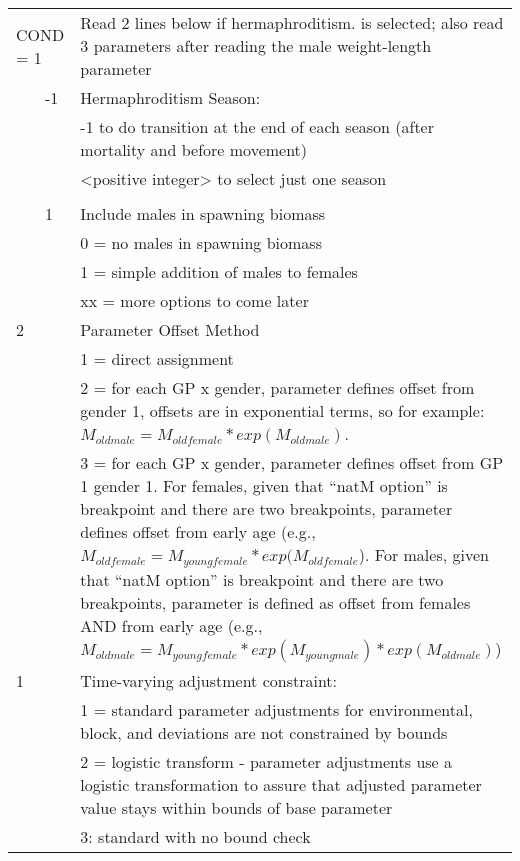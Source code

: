 \begin{center}
\begin{longtable}{p{0.5cm} p{2cm} p{12cm}}
	  \multicolumn{2}{l}{COND = 1}& Read 2 lines below if hermaphroditism. is selected; also read 3 parameters after reading the male weight-length parameter\\
	  & -1 & Hermaphroditism Season: \\
	  &    & -1 to do transition at the end of each season (after mortality and before movement)\\
	  &    & <positive integer> to select just one season\\
	  \\
	  & 1  & Include males in spawning biomass \\
	  &    & 0 = no males in spawning biomass \\
	  &    & 1 = simple addition of males to females\\
	  &    & xx = more options to come later \\
	  \hline

	  2 & & Parameter Offset Method \\
	    & & 1 = direct assignment \\
	    & & 2 = for each GP x gender, parameter defines offset from gender 1, offsets are in exponential terms, so for example: $M_{oldmale} = M_{oldfemale}*exp(M_{oldmale})$. \\
	    & & 3 = for each GP x gender, parameter defines offset from GP 1 gender 1.  For females, given that “natM option” is breakpoint and there are two breakpoints, parameter defines offset from early age (e.g., $M_{oldfemale} = M_{youngfemale}*exp(M_{oldfemale}$). For males, given that “natM option” is breakpoint and there are two breakpoints, parameter is defined as offset from females AND from early age (e.g., $M_{oldmale} = M_{youngfemale}*exp(M_{youngmale})*exp(M_{oldmale})$)\\
	 \hline

	 1 & & Time-varying adjustment constraint:\\
	   & & 1 = standard parameter adjustments for environmental, block, and deviations are not constrained by bounds \\
	   & & 2 = logistic transform - parameter adjustments use a logistic transformation to assure that adjusted parameter value stays within bounds of base parameter \\
	   & & 3: standard with no bound check \\
	 \hline

	\end{longtable}
\end{center}


